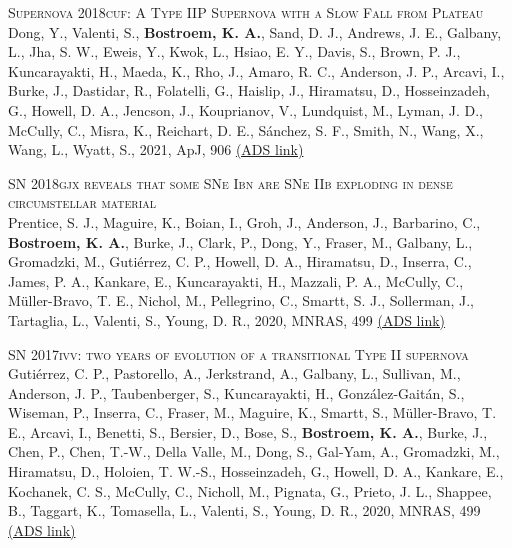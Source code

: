 \begin{revnumerate}[67]
    \item{\textsc{Supernova 2018cuf: A Type IIP Supernova with a Slow Fall from Plateau}\\ 
    Dong, Y., Valenti, S., \textbf{Bostroem, K. A.}, Sand, D. J., Andrews, J. E., Galbany, L., Jha, S. W., Eweis, Y., Kwok, L., Hsiao, E. Y., Davis, S., Brown, P. J., Kuncarayakti, H., Maeda, K., Rho, J., Amaro, R. C., Anderson, J. P., Arcavi, I., Burke, J., Dastidar, R., Folatelli, G., Haislip, J., Hiramatsu, D., Hosseinzadeh, G., Howell, D. A., Jencson, J., Kouprianov, V., Lundquist, M., Lyman, J. D., McCully, C., Misra, K., Reichart, D. E., Sánchez, S. F., Smith, N., Wang, X., Wang, L., Wyatt, S., 2021, ApJ, 906 
    \color{blue}\href{https://ui.adsabs.harvard.edu/abs/2021ApJ...906...56D}{(ADS link)}\color{black}}\\
    
    \item{\textsc{SN 2018gjx reveals that some SNe Ibn are SNe IIb exploding in dense circumstellar material}\\ 
    Prentice, S. J., Maguire, K., Boian, I., Groh, J., Anderson, J., Barbarino, C., \textbf{Bostroem, K. A.}, Burke, J., Clark, P., Dong, Y., Fraser, M., Galbany, L., Gromadzki, M., Guti\'{e}rrez, C. P., Howell, D. A., Hiramatsu, D., Inserra, C., James, P. A., Kankare, E., Kuncarayakti, H., Mazzali, P. A., McCully, C., Müller-Bravo, T. E., Nichol, M., Pellegrino, C., Smartt, S. J., Sollerman, J., Tartaglia, L., Valenti, S., Young, D. R., 2020, MNRAS, 499 
    \color{blue}\href{https://ui.adsabs.harvard.edu/abs/2020MNRAS.499.1450P}{(ADS link)}\color{black}}\\
    
    \item{\textsc{SN 2017ivv: two years of evolution of a transitional Type II supernova}\\ 
    Gutiérrez, C. P., Pastorello, A., Jerkstrand, A., Galbany, L., Sullivan, M., Anderson, J. P., Taubenberger, S., Kuncarayakti, H., Gonz\'{a}lez-Gait\'{a}n, S., Wiseman, P., Inserra, C., Fraser, M., Maguire, K., Smartt, S., M\"{u}ller-Bravo, T. E., Arcavi, I., Benetti, S., Bersier, D., Bose, S., \textbf{Bostroem, K. A.}, Burke, J., Chen, P., Chen, T.-W., Della Valle, M., Dong, S., Gal-Yam, A., Gromadzki, M., Hiramatsu, D., Holoien, T. W.-S., Hosseinzadeh, G., Howell, D. A., Kankare, E., Kochanek, C. S., McCully, C., Nicholl, M., Pignata, G., Prieto, J. L., Shappee, B., Taggart, K., Tomasella, L., Valenti, S., Young, D. R., 2020, MNRAS, 499 
    \color{blue}\href{https://ui.adsabs.harvard.edu/abs/2020MNRAS.499..974G}{(ADS link)}\color{black}}\\
    

\end{revnumerate}

